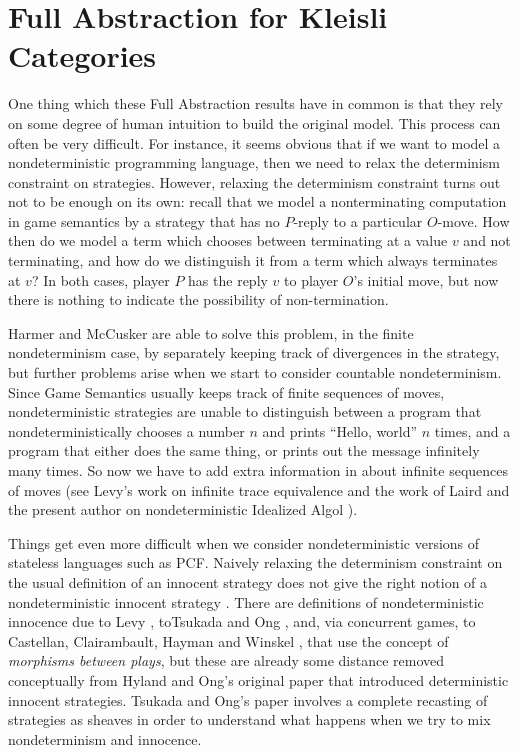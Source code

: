 \section{Full Abstraction for Kleisli Categories}

One thing which these Full Abstraction results have in common is that they rely on some degree of human intuition to build the original model.  
This process can often be very difficult.  
For instance, it seems obvious that if we want to model a nondeterministic programming language, then we need to relax the determinism constraint on strategies.  
However, relaxing the determinism constraint turns out not to be enough on its own: recall that we model a nonterminating computation in game semantics by a strategy that has no $P$-reply to a particular $O$-move.  
How then do we model a term which chooses between terminating at a value $v$ and not terminating, and how do we distinguish it from a term which always terminates at $v$?  
In both cases, player $P$ has the reply $v$ to player $O$'s initial move, but now there is nothing to indicate the possibility of non-termination.  

Harmer and McCusker are able to solve this problem, in the finite nondeterminism case, by separately keeping track of divergences in the strategy, but further problems arise when we start to consider countable nondeterminism.  
Since Game Semantics usually keeps track of finite sequences of moves, nondeterministic strategies are unable to distinguish between a program that nondeterministically chooses a number $n$ and prints ``Hello, world'' $n$ times, and a program that either does the same thing, or prints out the message infinitely many times.
So now we have to add extra information in about infinite sequences of moves (see Levy's work on infinite trace equivalence \cite{LevyGsInfinite} and the work of Laird and the present author on nondeterministic Idealized Algol \cite{CslPaper}).

Things get even more difficult when we consider nondeterministic versions of stateless languages such as PCF.  
Naively relaxing the determinism constraint on the usual definition of an innocent strategy does not give the right notion of a nondeterministic innocent strategy \cite{TsukadaSheaves}.  
There are definitions of nondeterministic innocence due to Levy \cite{levy2014morphisms}, toTsukada and Ong \cite{TsukadaSheaves}, and, via concurrent games, to Castellan, Clairambault, Hayman and Winskel \cite{NonAngelic}, that use the concept of \emph{morphisms between plays}, but these are already some distance removed conceptually from Hyland and Ong's original paper that introduced deterministic innocent strategies.
Tsukada and Ong's paper involves a complete recasting of strategies as sheaves in order to understand what happens when we try to mix nondeterminism and innocence.

